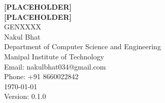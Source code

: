 \newcommand{\titlepagebreak}{\\[1em]}
\begin{titlepage}
    \vspace*{\fill} %

    \centering
    {\Huge \bfseries [PLACEHOLDER]\titlepagebreak [PLACEHOLDER]}\\[1in]
    
    {\Large GENXXXX}\\[0.75in]
    
    {\huge Nakul Bhat}\\[0.5in]
    
    {\large Department of Computer Science and Engineering \titlepagebreak Manipal Institute of Technology}\\[0.5in]
    
    {\large Email: nakulbhat034@gmail.com \titlepagebreak Phone: +91 8660022842}\\[1.5cm]
    
    {\large \today}\\[0.5cm]
    
    {\large Version: 0.1.0}

    \vspace*{\fill} %
\end{titlepage}
\restoregeometry